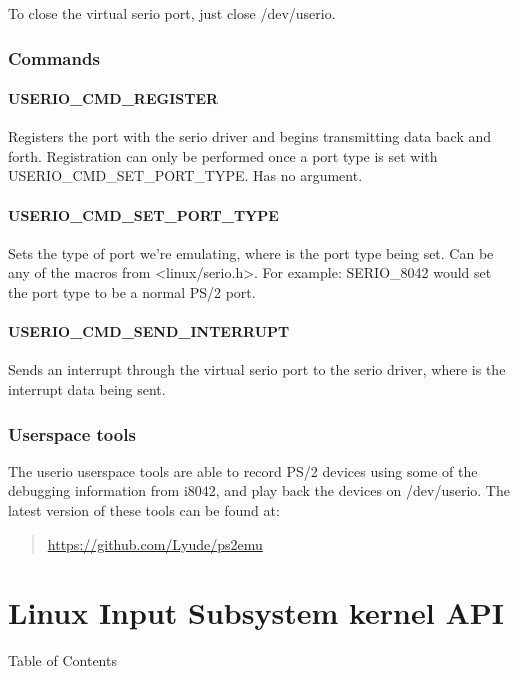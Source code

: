 \documentclass[a4paper,8pt,english]{sphinxmanual}
\begin{document}
To close the virtual serio port, just close /dev/userio.


\subsection{Commands}
\label{input/userio:commands}

\subsubsection{USERIO\_CMD\_REGISTER}
\label{input/userio:userio-cmd-register}
Registers the port with the serio driver and begins transmitting data back and
forth. Registration can only be performed once a port type is set with
USERIO\_CMD\_SET\_PORT\_TYPE. Has no argument.


\subsubsection{USERIO\_CMD\_SET\_PORT\_TYPE}
\label{input/userio:userio-cmd-set-port-type}
Sets the type of port we're emulating, where  is the port type being
set. Can be any of the macros from \textless{}linux/serio.h\textgreater{}. For example: SERIO\_8042
would set the port type to be a normal PS/2 port.


\subsubsection{USERIO\_CMD\_SEND\_INTERRUPT}
\label{input/userio:userio-cmd-send-interrupt}
Sends an interrupt through the virtual serio port to the serio driver, where
 is the interrupt data being sent.


\subsection{Userspace tools}
\label{input/userio:userspace-tools}
The userio userspace tools are able to record PS/2 devices using some of the
debugging information from i8042, and play back the devices on /dev/userio. The
latest version of these tools can be found at:
\begin{quote}

\href{https://github.com/Lyude/ps2emu}{https://github.com/Lyude/ps2emu}
\end{quote}


\chapter{Linux Input Subsystem kernel API}
\label{input/input_kapi:linux-input-subsystem-kernel-api}\label{input/input_kapi::doc}
Table of Contents
\end{document}
